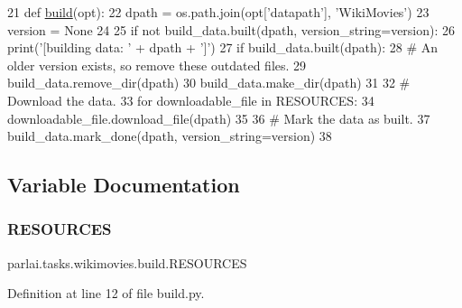 \begin{DoxyCode}
21 \textcolor{keyword}{def }\hyperlink{namespacedialog__babi__feedback_1_1build_a7a9d289f7493a5ded13c4b7f071b6184}{build}(opt):
22     dpath = os.path.join(opt[\textcolor{stringliteral}{'datapath'}], \textcolor{stringliteral}{'WikiMovies'})
23     version = \textcolor{keywordtype}{None}
24 
25     \textcolor{keywordflow}{if} \textcolor{keywordflow}{not} build\_data.built(dpath, version\_string=version):
26         print(\textcolor{stringliteral}{'[building data: '} + dpath + \textcolor{stringliteral}{']'})
27         \textcolor{keywordflow}{if} build\_data.built(dpath):
28             \textcolor{comment}{# An older version exists, so remove these outdated files.}
29             build\_data.remove\_dir(dpath)
30         build\_data.make\_dir(dpath)
31 
32         \textcolor{comment}{# Download the data.}
33         \textcolor{keywordflow}{for} downloadable\_file \textcolor{keywordflow}{in} RESOURCES:
34             downloadable\_file.download\_file(dpath)
35 
36         \textcolor{comment}{# Mark the data as built.}
37         build\_data.mark\_done(dpath, version\_string=version)
38 \end{DoxyCode}


\subsection{Variable Documentation}
\mbox{\label{namespaceparlai_1_1tasks_1_1wikimovies_1_1build_a6d4a343df2cf4745e705584544ac3369}} 
\subsubsection{\texorpdfstring{R\+E\+S\+O\+U\+R\+C\+ES}{RESOURCES}}
{\footnotesize\ttfamily parlai.\+tasks.\+wikimovies.\+build.\+R\+E\+S\+O\+U\+R\+C\+ES}



Definition at line 12 of file build.\+py.

